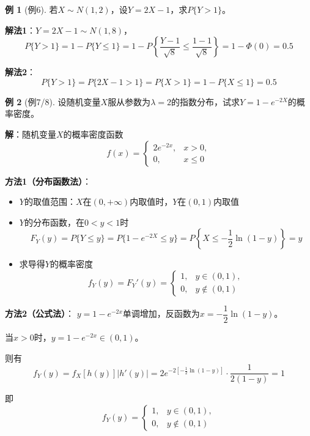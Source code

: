\documentclass[11pt,a4paper]{report}
\theoremstyle{definition}
\newtheorem{example}{例}[chapter]
\theoremstyle{plain}
\begin{document}
\begin{example}[例6]
若\(X\sim N(1,2)\)，设\(Y=2X-1\)，求\(P\{Y>1\}\)。

\textbf{解法1}：\(Y=2X-1\sim N(1,8)\)，
\[
P\{Y>1\}=1-P\{Y\leq 1\}=1-P\left\{\frac{Y-1}{\sqrt{8}}\leq\frac{1-1}{\sqrt{8}}\right\}=1-\Phi(0)=0.5
\]

\textbf{解法2}：
\[
P\{Y>1\}=P\{2X-1>1\}=P\{X>1\}=1-P\{X\leq 1\}=0.5
\]
\end{example}

\begin{example}[例7/8]
设随机变量\(X\)服从参数为\(\lambda=2\)的指数分布，试求\(Y=1-e^{-2X}\)的概率密度。

\textbf{解}：随机变量\(X\)的概率密度函数
\[
f(x)=\begin{cases}
2e^{-2x}, & x>0, \\[6pt]
0, & x\leq 0
\end{cases}
\]

\textbf{方法1（分布函数法）}：
\begin{itemize}[leftmargin=2em]
    \item \(Y\)的取值范围：\(X\)在\((0,+\infty)\)内取值时，\(Y\)在\((0,1)\)内取值
    \item \(Y\)的分布函数，在\(0<y<1\)时
    \[
    F_Y(y)=P\{Y\leq y\}=P\{1-e^{-2X}\leq y\}=P\left\{X\leq-\frac{1}{2}\ln(1-y)\right\}=y
    \]
    \item 求导得\(Y\)的概率密度
    \[
    f_Y(y)=F_Y'(y)=\begin{cases}
    1, & y\in(0,1), \\[6pt]
    0, & y\notin(0,1)
    \end{cases}
    \]
\end{itemize}

\textbf{方法2（公式法）}：
\(y=1-e^{-2x}\)单调增加，反函数为\(x=-\dfrac{1}{2}\ln(1-y)\)。

当\(x>0\)时，\(y=1-e^{-2x}\in(0,1)\)。

则有
\[
f_Y(y)=f_X[h(y)]|h'(y)|=2e^{-2\left[-\frac{1}{2}\ln(1-y)\right]}\cdot\frac{1}{2(1-y)}=1
\]

即
\[
f_Y(y)=\begin{cases}
1, & y\in(0,1), \\[6pt]
0, & y\notin(0,1)
\end{cases}
\]
\end{example}
\end{document}
